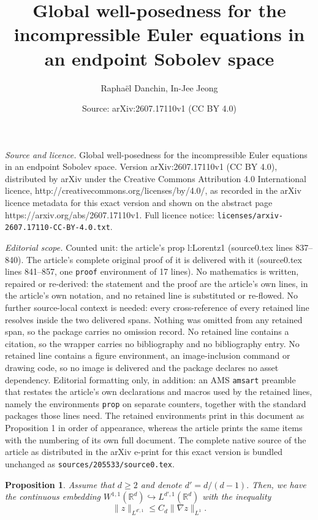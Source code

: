 \documentclass[10pt,a4paper]{amsart}
\title{Global well-posedness for the incompressible Euler equations in an endpoint Sobolev space}
\author{Rapha\"el Danchin, In-Jee Jeong}
\date{Source: arXiv:2607.17110v1 (CC BY 4.0)}
\newtheorem{prop}{Proposition}
\newcommand{\R}{{\mathbb R}}
\begin{document}
\maketitle

\noindent\emph{Source and licence.} Global well-posedness for the incompressible Euler equations in an endpoint Sobolev space. Version arXiv:2607.17110v1 (CC BY 4.0), distributed by arXiv under the Creative Commons Attribution 4.0 International licence, http://creativecommons.org/licenses/by/4.0/, as recorded in the arXiv licence metadata for this exact version and shown on the abstract page https://arxiv.org/abs/2607.17110v1. Full licence notice: \texttt{licenses/arxiv-2607.17110-CC-BY-4.0.txt}.\par\smallskip

\noindent\textit{Editorial scope.} Counted unit: the article's prop l:Lorentz1 (source0.tex lines 837--840). The article's complete original proof of it is delivered with it (source0.tex lines 841--857, one \texttt{proof} environment of 17 lines). No mathematics is written, repaired or re-derived: the statement and the proof are the article's own lines, in the article's own notation, and no retained line is substituted or re-flowed.  No further source-local context is needed: every cross-reference of every retained line resolves inside the two delivered spans.  Nothing was omitted from any retained span, so the package carries no omission record.  No retained line contains a citation, so the wrapper carries no bibliography and no bibliography entry.  No retained line contains a figure environment, an image-inclusion command or drawing code, so no image is delivered and the package declares no asset dependency.  Editorial formatting only, in addition: an AMS \texttt{amsart} preamble that restates the article's own declarations and macros used by the retained lines, namely the environments \texttt{prop} on separate counters, together with the standard packages those lines need.  The retained environments print in this document as Proposition 1 in order of appearance, whereas the article prints the same items with the numbering of its own full document.  The complete native source of the article as distributed in the arXiv e-print for this exact version is bundled unchanged as \texttt{sources/205533/source0.tex}.
 \begin{prop} \label{l:Lorentz1} Assume that  $d\geq2$ and denote $d'=d/(d-1).$ Then,  we have the continuous embedding $W^{1,1}(\R^d)\hookrightarrow
 L^{d',1}(\R^d)$ with the inequality 
 $$ \|z\|_{L^{d',1}}\leq C_d\|\nabla z\|_{L^1}.$$
 \end{prop}
\end{document}
